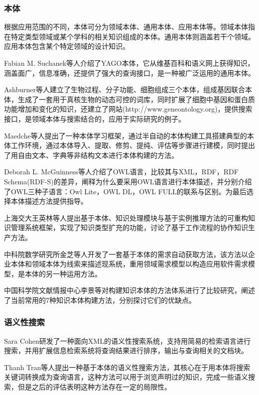\documentclass[12pt,a4paper]{article}
\begin{document}
		\subsubsection{本体}
	根据应用范围的不同，本体可分为领域本体、通用本体、应用本体等。领域本体指在特定类型领域或某个学科的相关知识组成的本体。通用本体则涵盖若干个领域。应用本体包含某个特定领域的设计知识。
	
	Fabian M. Suchanek\cite{5}等人介绍了YAGO本体，它从维基百科和语义网上获得知识，涵盖面广，信息准确，还提供了强大的查询接口，是一种被广泛运用的通用本体。
	
	Ashburner\cite{6}等人建立了生物过程、分子功能、细胞组成三个本体，组成基因联合本体，生成了一套用于真核生物的动态可控的词库，同时扩展了细胞中基因和蛋白质功能增加和变化的知识，还建立了网站(http://www.geneontology.org)，提供搜索接口，是领域本体与搜索结合的，应用于实际研究的例子。
	
	Maedche\cite{7}等人提出了一种本体学习框架，通过半自动的本体构建工具搭建典型的本体工作环境，通过本体导入、提取、修剪、提纯、评估等步骤进行建模，同时提出了用自由文本、字典等非结构文本进行本体构建的方法。
	
	Deborah L. McGuinness\cite{8}等人介绍了OWL语言，比较其与XML，RDF，RDF Schema(RDF-S)的差异，阐释为什么要采用OWL语言进行本体描述，并分别介绍了OWL三种子语言：Owl Lite，OWL DL，OWL FULL的联系与区别。为最后选择本体描述方法提供指导。
	
	上海交大王英林\cite{9}等人提出基于本体、知识处理模块与基于实例推理方法的可重构知识管理系统框架，实现了知识类型扩充的功能，讨论了基于工作流程的协作知识生产方法。
	
	中科院数学研究所金芝\cite{10}等人开发了一套基于本体的需求自动获取方法，该方法以企业本体和领域本体为线索来描述现系统，重用领域需求模型以构造应用软件需求模型，是本体的另一种运用方法。
	
	中国科学院文献情报中心李景\cite{11}等对构建知识本体的方法体系进行了比较研究，阐述了当前常用的7种知识本体构建方法，分别探讨它们的优缺点。
	
		\subsubsection{语义性搜索}
	Sara Cohen\cite{12}研发了一种面向XML的语义性搜索系统，支持用简易的检索语言进行搜索，并用扩展信息检索系统将查询结果进行排序，输出与查询相关的文档块。

	Thanh Tran\cite{13}等人提出一种基于本体的语义性搜索方法，其核心在于用本体将搜索关键词转换成为查询语言，这种方法可以用于浏览声明过的知识，完成一些语义搜索，但是之后的评估表明这种方法存在一定的局限性。
\end{document}
